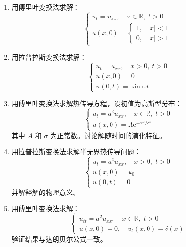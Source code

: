 \begin{enumerate}
    \item 用傅里叶变换法求解：
    \begin{equation}
        \begin{cases}
            u_t = u_{xx}, \quad x \in \mathbb{R}, \; t > 0 \\
            u(x, 0) = \begin{cases}
                1, & |x| < 1 \\
                0, & |x| > 1
            \end{cases}
        \end{cases}
    \end{equation}
    
    \item 用拉普拉斯变换法求解：
    \begin{equation}
        \begin{cases}
            u_t = u_{xx}, \quad x > 0, \; t > 0 \\
            u(x, 0) = 0 \\
            u(0, t) = \sin\omega t
        \end{cases}
    \end{equation}
    
    \item 用傅里叶变换法求解热传导方程，设初值为高斯型分布：
    \begin{equation}
        \begin{cases}
            u_t = a^2 u_{xx}, \quad x \in \mathbb{R}, \; t > 0 \\
            u(x, 0) = A\mathrm{e}^{-x^2/\sigma^2}
        \end{cases}
    \end{equation}
    其中 $A$ 和 $\sigma$ 为正常数。讨论解随时间的演化特征。
    
    \item 用拉普拉斯变换法求解半无界热传导问题：
    \begin{equation}
        \begin{cases}
            u_t = a^2 u_{xx}, \quad x > 0, \; t > 0 \\
            u(x, 0) = u_0 \\
            u(0, t) = 0
        \end{cases}
    \end{equation}
    并解释解的物理意义。
    
    \item 用傅里叶变换法求解：
    \begin{equation}
        \begin{cases}
            u_{tt} = a^2 u_{xx}, \quad x \in \mathbb{R}, \; t > 0 \\
            u(x, 0) = 0, \quad u_t(x, 0) = \delta(x)
        \end{cases}
    \end{equation}
    验证结果与达朗贝尔公式一致。
    

\end{enumerate}

